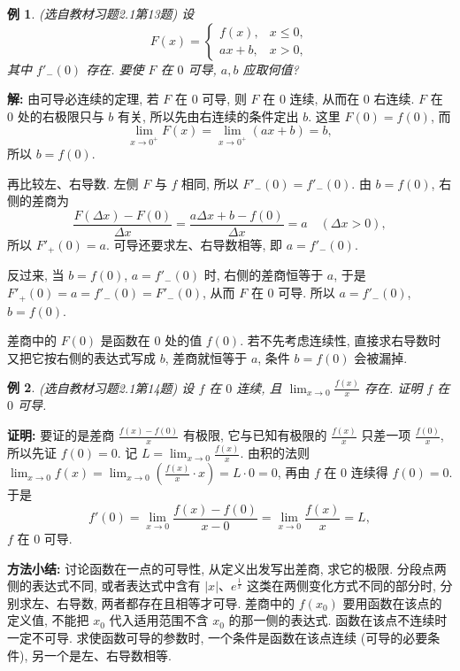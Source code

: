 \documentclass[UTF8,openany]{ctexbook}
\theoremstyle{chinesetextbook}
\newtheorem{example}{例}[section]
\newenvironment{cnproof}{\par\indent\textbf{证明:} \ignorespaces}{\par}
\newenvironment{cnsolution}{\par\indent\textbf{解:} \ignorespaces}{\par}
\begin{document}
\begin{example}\label{ex:c2-h1-13}
\textnormal{(选自教材习题2.1第13题)} 设
\[
F(x)=\begin{cases}f(x),&x\le0,\\ax+b,&x>0,\end{cases}
\]
其中 $f'_-(0)$ 存在. 要使 $F$ 在 $0$ 可导, $a,b$ 应取何值?
\end{example}
\begin{cnsolution}
由可导必连续的定理, 若 $F$ 在 $0$ 可导, 则 $F$ 在 $0$ 连续, 从而在 $0$ 右连续. $F$ 在 $0$ 处的右极限只与 $b$ 有关, 所以先由右连续的条件定出 $b$. 这里 $F(0)=f(0)$, 而
\[
\lim_{x\to0^+}F(x)=\lim_{x\to0^+}(ax+b)=b,
\]
所以 $b=f(0)$.

再比较左、右导数. 左侧 $F$ 与 $f$ 相同, 所以 $F'_-(0)=f'_-(0)$. 由 $b=f(0)$, 右侧的差商为
\[
\frac{F(\Delta x)-F(0)}{\Delta x}=\frac{a\Delta x+b-f(0)}{\Delta x}=a\quad(\Delta x>0),
\]
所以 $F'_+(0)=a$. 可导还要求左、右导数相等, 即 $a=f'_-(0)$.

反过来, 当 $b=f(0)$, $a=f'_-(0)$ 时, 右侧的差商恒等于 $a$, 于是 $F'_+(0)=a=f'_-(0)=F'_-(0)$, 从而 $F$ 在 $0$ 可导. 所以 $a=f'_-(0)$, $b=f(0)$.
\end{cnsolution}
差商中的 $F(0)$ 是函数在 $0$ 处的值 $f(0)$. 若不先考虑连续性, 直接求右导数时又把它按右侧的表达式写成 $b$, 差商就恒等于 $a$, 条件 $b=f(0)$ 会被漏掉.
\begin{example}\label{ex:c2-h1-14}
\textnormal{(选自教材习题2.1第14题)} 设 $f$ 在 $0$ 连续, 且 $\displaystyle\lim_{x\to0}\frac{f(x)}x$ 存在. 证明 $f$ 在 $0$ 可导.
\end{example}
\begin{cnproof}
要证的是差商 $\displaystyle\frac{f(x)-f(0)}x$ 有极限, 它与已知有极限的 $\displaystyle\frac{f(x)}x$ 只差一项 $\displaystyle\frac{f(0)}x$, 所以先证 $f(0)=0$. 记 $\displaystyle L=\lim_{x\to0}\frac{f(x)}x$. 由积的法则 $\displaystyle\lim_{x\to0}f(x)=\lim_{x\to0}\left(\frac{f(x)}x\cdot x\right)=L\cdot0=0$, 再由 $f$ 在 $0$ 连续得 $f(0)=0$. 于是
\[
f'(0)=\lim_{x\to0}\frac{f(x)-f(0)}{x-0}=\lim_{x\to0}\frac{f(x)}x=L,
\]
$f$ 在 $0$ 可导.
\end{cnproof}
\par\indent\textbf{方法小结:} 讨论函数在一点的可导性, 从定义出发写出差商, 求它的极限. 分段点两侧的表达式不同, 或者表达式中含有 $|x|$、$e^{\frac1x}$ 这类在两侧变化方式不同的部分时, 分别求左、右导数, 两者都存在且相等才可导. 差商中的 $f(x_0)$ 要用函数在该点的定义值, 不能把 $x_0$ 代入适用范围不含 $x_0$ 的那一侧的表达式. 函数在该点不连续时一定不可导. 求使函数可导的参数时, 一个条件是函数在该点连续 (可导的必要条件), 另一个是左、右导数相等.
\end{document}
